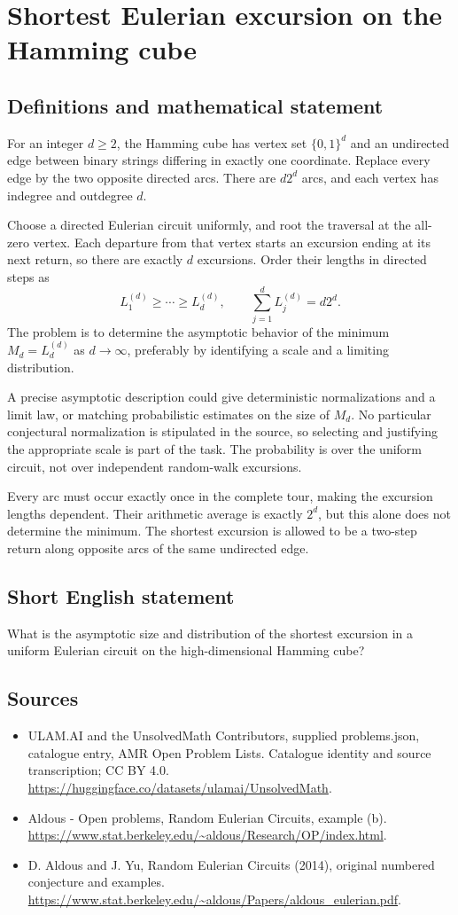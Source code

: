 \documentclass[11pt,a4paper]{article}
\begin{document}
\section*{Shortest Eulerian excursion on the Hamming cube}\label{statement}

\subsection{Definitions and mathematical statement}
For an integer $d\ge2$, the Hamming cube has vertex set $\{0,1\}^d$ and an undirected edge between binary strings differing in exactly one coordinate. Replace every edge by the two opposite directed arcs. There are $d2^d$ arcs, and each vertex has indegree and outdegree $d$.

Choose a directed Eulerian circuit uniformly, and root the traversal at the all-zero vertex. Each departure from that vertex starts an excursion ending at its next return, so there are exactly $d$ excursions. Order their lengths in directed steps as
\[
L_1^{(d)}\ge\cdots\ge L_d^{(d)},\qquad
\sum_{j=1}^dL_j^{(d)}=d2^d.
\]
The problem is to determine the asymptotic behavior of the minimum $M_d=L_d^{(d)}$ as $d\to\infty$, preferably by identifying a scale and a limiting distribution.

A precise asymptotic description could give deterministic normalizations and a limit law, or matching probabilistic estimates on the size of $M_d$. No particular conjectural normalization is stipulated in the source, so selecting and justifying the appropriate scale is part of the task. The probability is over the uniform circuit, not over independent random-walk excursions.

Every arc must occur exactly once in the complete tour, making the excursion lengths dependent. Their arithmetic average is exactly $2^d$, but this alone does not determine the minimum. The shortest excursion is allowed to be a two-step return along opposite arcs of the same undirected edge.
\subsection{Short English statement}
What is the asymptotic size and distribution of the shortest excursion in a uniform Eulerian circuit on the high-dimensional Hamming cube?
\subsection{Sources}
\begin{itemize}
\item[S1] ULAM.AI and the UnsolvedMath Contributors, supplied problems.json, catalogue entry, AMR Open Problem Lists. Catalogue identity and source transcription; CC BY 4.0.
\url{https://huggingface.co/datasets/ulamai/UnsolvedMath}.
\item[S2] Aldous - Open problems, Random Eulerian Circuits, example (b). 
\url{https://www.stat.berkeley.edu/~aldous/Research/OP/index.html}.
\item[S3] D. Aldous and J. Yu, Random Eulerian Circuits (2014), original numbered conjecture and examples.
\url{https://www.stat.berkeley.edu/~aldous/Papers/aldous_eulerian.pdf}.
\end{itemize}
\end{document}
